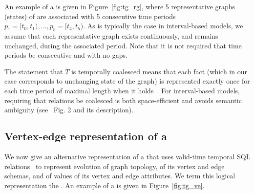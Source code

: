 An example of a \tg is given in Figure~\ref{fig:tg_rg}, where 5
representative graphs (states) of  are associated with 5
consecutive time periods $p_1=[t_0,t_1), \ldots, p_5=[t_4,t_5)$.  
%
As is typically the case in interval-based models, we assume that each
representative graph exists continuously, and remains unchanged,
during the associated period.  Note that it is not required that time
periods be consecutive and with no gaps.

The statement that $T$ is temporally coalesced means that each fact
(which in our case corresponds to unchanging state of the graph) is
represented exactly once for each time period of maximal length when
it holds~\cite{DBLP:conf/vldb/BohlenSS96}.  For interval-based models,
requiring that relations be coalesced is both space-efficient and
avoids semantic ambiguity (see~\cite{DBLP:reference/db/JensenS09k}
Fig. 2 and its description).

\subsection{Vertex-edge representation of a \tg}
\label{sec:model:ve}

We now give an alternative representation of a \tg that  uses
valid-time temporal SQL relations~\cite{DBLP:conf/vldb/BohlenSS96} to
represent evolution of graph topology, of its vertex and edge schemas,
and of values of its vertex and edge attributes.  We term this logical
representation the {\em \ve \tg}.  An example of a \ve \tg is given in
Figure~\ref{fig:tg_ve}.




